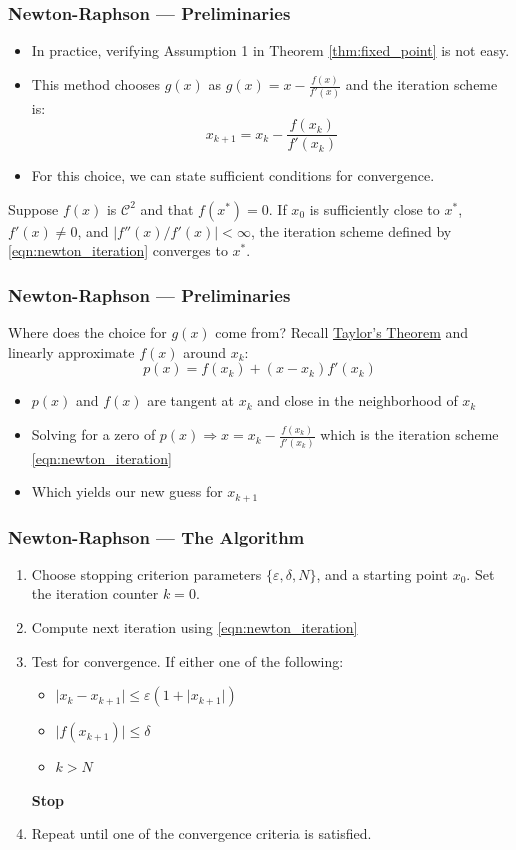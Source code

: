\documentclass[11pt,xcolor={svgnames},aspectratio=169,usepdftitle=false]{beamer}
\begin{document}
\begin{frame}
  \frametitle{Newton-Raphson --- Preliminaries}
\begin{itemize}
  \item In practice, verifying Assumption 1 in Theorem \ref{thm:fixed_point} is not easy.
  \item This method chooses $g(x)$ as $g(x) = x - \frac{f(x)}{f'(x)}$ and the iteration scheme is:
  \begin{equation}
  x_{k+1} = x_k - \frac{f(x_k)}{f'(x_k)} \label{eqn:newton_iteration}
  \end{equation}
  \item For this choice, we can state sufficient conditions for convergence.
\end{itemize}

\begin{theorem}
Suppose $f(x)$ is $\mathcal{C}^2$ and that $f(x^*) = 0$. If $x_0$ is sufficiently close to $x^*$, $f'(x)\neq 0$, and $\lvert f''(x) / f'(x)\rvert < \infty$, the iteration scheme defined by \eqref{eqn:newton_iteration} converges to $x^*$.
\end{theorem}
\end{frame}

\begin{frame}
  \frametitle{Newton-Raphson --- Preliminaries}
Where does the choice for $g(x)$ come from? Recall \href{https://en.wikipedia.org/wiki/Taylor's_theorem}{Taylor's Theorem} and linearly approximate $f(x)$ around $x_k$:
\[
p(x) = f(x_k) + (x - x_k)f'(x_k)
\]
\begin{itemize}
  \item $p(x)$ and $f(x)$ are tangent at $x_k$ and close in the neighborhood of $x_k$
  \item Solving for a zero of $p(x) \Rightarrow x = x_k - \frac{f(x_k)}{f'(x_k)}$ which is the iteration scheme \eqref{eqn:newton_iteration}
  \item Which yields our new guess for $x_{k+1}$
\end{itemize}
\end{frame}

\begin{frame}
  \frametitle{Newton-Raphson --- The Algorithm}
\begin{enumerate}
  \item Choose stopping criterion parameters $\{\varepsilon, \delta, N\}$, and a starting point $x_0$. Set the iteration counter $k = 0$.
  \item Compute next iteration using \eqref{eqn:newton_iteration}
  \item Test for convergence. If either one of the following:
  \begin{itemize}
    \item $\lvert x_k - x_{k+1} \rvert \leq \varepsilon (1 + \lvert x_{k+1}\rvert)$
    \item $\lvert f(x_{k+1}) \rvert \leq \delta$
    \item $k > N$
  \end{itemize}
  \textbf{Stop}
  \item Repeat until one of the convergence criteria is satisfied.
\end{enumerate}
\end{frame}
\end{document}
